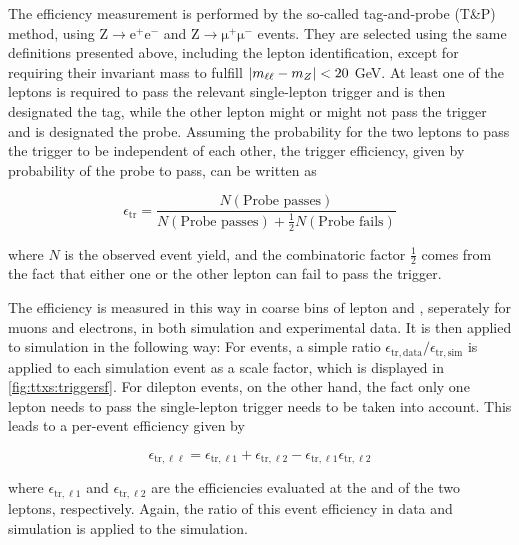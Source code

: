 The efficiency measurement is performed by the so-called tag-and-probe (T\&P) method, using $\mathrm{Z} \rightarrow \mathrm{e^+ e^-}$ and $\mathrm{Z} \rightarrow \mathrm{\mu^+ \mu^-}$ events. They are selected using the same definitions presented above, including the lepton identification, except for requiring their invariant mass to fulfill $| m_{\ell\ell} - m_Z | < 20$ GeV. At least one of the leptons is required to pass the relevant single-lepton trigger and is then designated the tag, while the other lepton might or might not pass the trigger and is designated the probe. Assuming the probability for the two leptons to pass the trigger to be independent of each other, the trigger efficiency, given by probability of the probe to pass, can be written as

\begin{equation}
    \epsilon_{\mathrm{tr}} = \frac{N (\text{Probe passes})}{ N (\text{Probe passes}) + \frac{1}{2} N (\text{Probe fails}) }
\end{equation}

where $N$ is the observed event yield, and the combinatoric factor $\frac{1}{2}$ comes from the fact that either one or the other lepton can fail to pass the trigger. 

The efficiency is measured in this way in coarse bins of lepton \pt and \abseta, seperately for muons and electrons, in both simulation and experimental data. It is then applied to simulation in the following way: For \ljets events, a simple ratio $\epsilon_{\mathrm{tr,data}} / \epsilon_{\mathrm{tr,sim}}$ is applied to each simulation event as a scale factor, which is displayed in \cref{fig:ttxs:triggersf}. For dilepton events, on the other hand, the fact only one lepton needs to pass the single-lepton trigger needs to be taken into account. This leads to a per-event efficiency given by

\begin{equation}
\label{eq:ttxs:triggersf}
    \epsilon_{\mathrm{tr,\ell \ell}} = \epsilon_{\mathrm{tr,\ell 1}} + \epsilon_{\mathrm{tr,\ell 2}} - \epsilon_{\mathrm{tr,\ell 1}} \epsilon_{\mathrm{tr,\ell 2}}
\end{equation}

where $\epsilon_{\mathrm{tr,\ell 1}}$ and $\epsilon_{\mathrm{tr,\ell 2}}$ are the efficiencies evaluated at the \pt and \abseta of the two leptons, respectively. Again, the ratio of this event efficiency in data and simulation is applied to the simulation.

